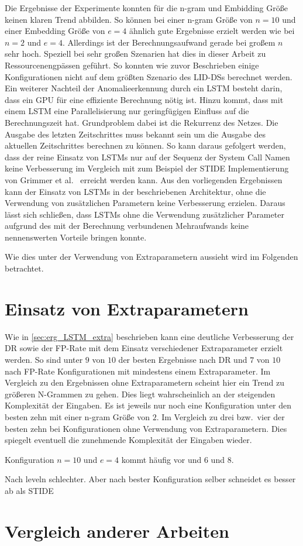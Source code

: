 Die Ergebnisse der Experimente konnten für die n-gram und Embidding Größe keinen klaren Trend abbilden.
So können bei einer n-gram Größe von $n=10$ und einer Embedding Größe von $e=4$ ähnlich gute Ergebnisse erzielt werden wie bei $n=2$ und $e=4$.
Allerdings ist der Berechnungsaufwand gerade bei großem $n$ sehr hoch.
Speziell bei sehr großen Szenarien hat dies in dieser Arbeit zu Ressourcenengpässen geführt.
So konnten wie zuvor Beschrieben einige Konfigurationen nicht auf dem größten Szenario des \acp{LID-DS} berechnet werden.
Ein weiterer Nachteil der Anomalieerkennung durch ein \ac{LSTM} besteht darin, dass ein GPU für eine effiziente Berechnung nötig ist.
Hinzu kommt, dass mit einem \ac{LSTM} eine Parallelisierung nur geringfügigen Einfluss auf die Berechnungszeit hat.
Grundproblem dabei ist die Rekurrenz des Netzes. 
Die Ausgabe des letzten Zeitschrittes muss bekannt sein um die Ausgabe des aktuellen Zeitschrittes berechnen zu können.
So kann daraus gefolgert werden, dass der reine Einsatz von \acp{LSTM} nur auf der Sequenz der System Call Namen keine Verbesserung im Vergleich mit zum Beispiel der \ac{STIDE} Implementierung von Grimmer et al.~\cite{IDSTHREADGRIMMER2021} erreicht werden kann.
Aus den vorliegenden Ergebnissen kann der Einsatz von \acp{LSTM} in der beschriebenen Architektur, ohne die Verwendung von zusätzlichen Parametern keine Verbesserung erzielen.
Daraus lässt sich schließen, dass \acp{LSTM} ohne die Verwendung zusätzlicher Parameter aufgrund des mit der Berechnung verbundenen Mehraufwands keine nennenswerten Vorteile bringen konnte.

Wie dies unter der Verwendung von Extraparametern aussieht wird im Folgenden betrachtet.

\section{Einsatz von Extraparametern}\label{sec:folgerungen_extra}

Wie in \autoref{sec:erg_LSTM_extra} beschrieben kann eine deutliche Verbesserung der \ac{DR} sowie  der \ac{FP}-Rate mit dem Einsatz verschiedener Extraparameter erzielt werden.
So sind unter $9$ von $10$ der besten Ergebnisse nach \ac{DR} und $7$ von $10$ nach \ac{FP}-Rate Konfigurationen mit mindestens einem Extraparameter.
Im Vergleich zu den Ergebnissen ohne Extraparametern scheint hier ein Trend zu größeren N-Grammen zu gehen.
Dies liegt wahrscheinlich an der steigenden Komplexität der Eingaben.
Es ist jeweils nur noch eine Konfiguration unter den besten zehn mit einer n-gram Größe von $2$.
Im Vergleich zu drei bzw.\ vier der besten zehn bei Konfigurationen ohne Verwendung von Extraparametern.
Dies spiegelt eventuell die zunehmende Komplexität der Eingaben wieder.  

Konfiguration $n=10$ und $e=4$ kommt häufig vor und $6$ und $8$.

Nach leveln schlechter. 
Aber nach bester Konfiguration selber schneidet es besser ab als \ac{STIDE}

\section{Vergleich anderer Arbeiten}\label{sec:folgerungen_extra}

